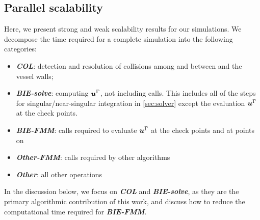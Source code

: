 \subsection{Parallel scalability}\label{ss:scalability}

  Here, we present strong and weak scalability results for our \rbc simulations. 
  We decompose the time required for a complete simulation into the following categories:%
 \begin{itemize}
    \item {\bf\em COL}: detection and resolution of collisions among
      \rbcs and between \rbcs and the vessel walls;
      \item {\bf\em BIE-solve}: computing ${\bm{u}}^{\Gamma}$, not including \fmm calls. This includes all of the steps for singular/near-singular integration in \cref{sec:solver} except the evaluation ${\bm{u}}^\Gamma$ at the check points.
      \item {\bf\em BIE-FMM}: \fmm calls required to evaluate ${\bm{u}}^{\Gamma}$ at the check points and at points on \rbcs
      \item {\bf\em Other-FMM}: \fmm calls required by other algorithms 
      \item {\bf\em Other}: all other operations
  \end{itemize}
In the discussion below, we focus on {\bf\em COL} and {\bf\em BIE-solve}, as
  they are the primary algorithmic contribution of this work, and discuss
  how to reduce the computational time required for {\bf\em BIE-FMM}.

